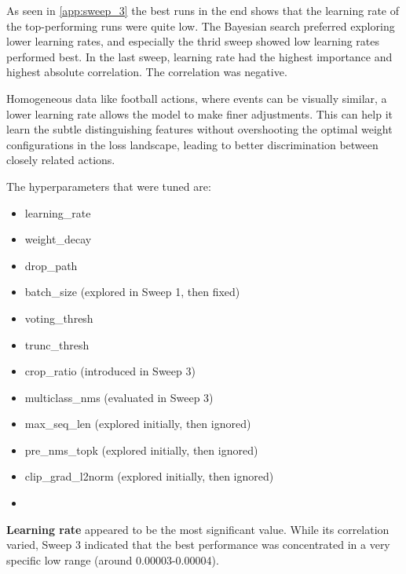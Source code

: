 
As seen in \autoref{app:sweep_3} the best runs in the end shows that the learning rate of the top-performing runs were quite low. The Bayesian search preferred exploring lower learning rates, and especially the thrid sweep showed low learning rates performed best. In the last sweep, learning rate had the highest importance and highest absolute correlation. The correlation was negative. 

Homogeneous data like football actions, where events can be visually similar, a lower learning rate allows the model to make finer adjustments. This can help it learn the subtle distinguishing features without overshooting the optimal weight configurations in the loss landscape, leading to better discrimination between closely related actions.


The hyperparameters that were tuned are:
\begin{itemize}
    \item learning\_rate
    \item weight\_decay
    \item drop\_path 
    \item batch\_size (explored in Sweep 1, then fixed)
    \item voting\_thresh
    \item trunc\_thresh
    \item crop\_ratio (introduced in Sweep 3)
    \item multiclass\_nms (evaluated in Sweep 3)
    \item max\_seq\_len (explored initially, then ignored)
    \item pre\_nms\_topk (explored initially, then ignored)
    \item clip\_grad\_l2norm (explored initially, then ignored)
    \item 
\end{itemize}

\textbf{Learning rate} appeared to be the most significant value. While its correlation varied, Sweep 3 indicated that the best performance was concentrated in a very specific low range (around 0.00003-0.00004). 

